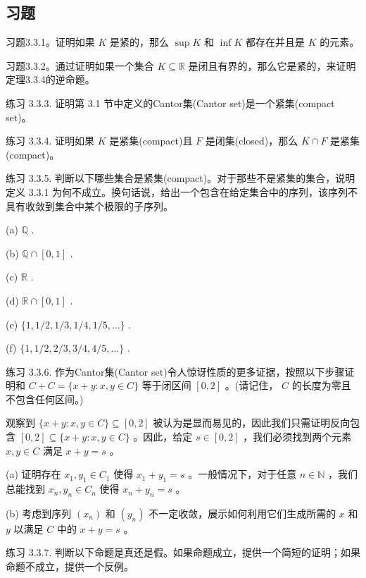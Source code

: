 \subsection{习题}

习题3.3.1。证明如果 \(K\) 是紧的，那么 \(\sup K\) 和 \(\inf K\) 都存在并且是 \(K\) 的元素。

习题3.3.2。通过证明如果一个集合 \(K \subseteq  \mathbb{R}\) 是闭且有界的，那么它是紧的，来证明定理3.3.4的逆命题。

练习 3.3.3. 证明第 3.1 节中定义的Cantor集(Cantor set)是一个紧集(compact set)。

练习 3.3.4. 证明如果 \(K\) 是紧集(compact)且 \(F\) 是闭集(closed)，那么 \(K \cap  F\) 是紧集(compact)。

练习 3.3.5. 判断以下哪些集合是紧集(compact)。对于那些不是紧集的集合，说明定义 3.3.1 为何不成立。换句话说，给出一个包含在给定集合中的序列，该序列不具有收敛到集合中某个极限的子序列。

(a) \(\mathbb{Q}\) .

(b) \(\mathbb{Q} \cap  \left\lbrack  {0,1}\right\rbrack\) .

(c) \(\mathbb{R}\) .

(d) \(\mathbb{R} \cap  \left\lbrack  {0,1}\right\rbrack\) .

(e) \(\{ 1,1/2,1/3,1/4,1/5,\ldots \}\) .

(f) \(\{ 1,1/2,2/3,3/4,4/5,\ldots \}\) .

练习 3.3.6. 作为Cantor集(Cantor set)令人惊讶性质的更多证据，按照以下步骤证明和 \(C + C = \{ x + y : x,y \in  C\}\) 等于闭区间 \(\left\lbrack  {0,2}\right\rbrack\) 。(请记住， \(C\) 的长度为零且不包含任何区间。)

观察到 \(\{ x + y : x,y \in  C\}  \subseteq  \left\lbrack  {0,2}\right\rbrack\) 被认为是显而易见的，因此我们只需证明反向包含 \(\left\lbrack  {0,2}\right\rbrack   \subseteq  \{ x + y : x,y \in  C\}\) 。因此，给定 \(s \in  \left\lbrack  {0,2}\right\rbrack\) ，我们必须找到两个元素 \(x,y \in  C\) 满足 \(x + y = s\) 。

(a) 证明存在 \({x}_{1},{y}_{1} \in  {C}_{1}\) 使得 \({x}_{1} + {y}_{1} = s\) 。一般情况下，对于任意 \(n \in  \mathbb{N}\) ，我们总能找到 \({x}_{n},{y}_{n} \in  {C}_{n}\) 使得 \({x}_{n} + {y}_{n} = s\) 。

(b) 考虑到序列 \(\left( {x}_{n}\right)\) 和 \(\left( {y}_{n}\right)\) 不一定收敛，展示如何利用它们生成所需的 \(x\) 和 \(y\) 以满足 \(C\) 中的 \(x + y = s\) 。

练习 3.3.7. 判断以下命题是真还是假。如果命题成立，提供一个简短的证明；如果命题不成立，提供一个反例。

